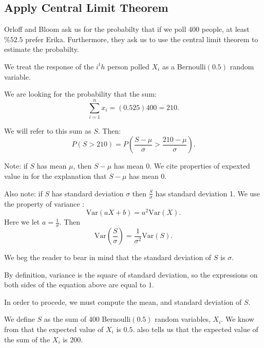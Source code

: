 \documentclass[a5paper,11pt]{article}
\begin{document}
\subsection{Apply Central Limit Theorem}
Orloff and Bloom ask us for the probabilty
that if we poll 400 people, at least 
$\%52.5$ prefer Erika. Furthermore, they 
ask us to use the central limit theorem 
to estimate the probabilty.

We treat the response of the $i^th$ person
polled $X_i$ as a Bernoulli$\left(0.5\right)$
random variable. 

We are looking for the probability that
the sum:
\begin{equation}
\sum_{i=1}^{n} x_i = (0.525)400 = 210. 
\end{equation}

We will refer to this sum as $S$. Then:
\begin{equation} \label{probS}
P \left(S > 210 \right) = 
P \left( \frac{S - \mu}{\sigma} > 
\frac{210- \mu}{\sigma}\right).
\end{equation}

Note: if $S$ has mean $\mu$, then 
$S-\mu$ has mean 0. We cite properties of
expexted value in \cite{reading4b} for
the explanation that $S-\mu$ has mean 0.

Also note: if  $S$ has standard deviation
$\sigma$ then $\frac{S}{\sigma}$ has 
standard deviation 1. We use the
property of variance \cite{reading5b}:
\begin{equation}
\text{Var}\left( aX  + b \right) =
a^2 \text{Var}\left(X \right).
\end{equation}
Here we let $a=\frac{1}{\sigma}$.
Then
\begin{equation}
\text{Var}\left(\frac{S}{\sigma}
\right) =
\frac{1}{\sigma^2}
\text{Var}\left( S \right).
\end{equation}

We beg the reader to bear in mind that
the standard deviation of $S$ is 
$\sigma$.

By definition, variance is the square
of standard deviation, so the
expressions on both sides of the equation
above are equal to $1$.

In order to procede, we must compute the
mean, and standard deviation of $S$.

We define $S$ as the sum of 400
Bernoulli$\left(0.5 \right)$ random
variables, $X_i$.  We know from 
\cite{reading4b} that the expected
value of $X_i$ is $0.5$. \cite{reading4b}
also tells us that the expected value
of the sum of the $X_i$ is 200. 
\end{document}
